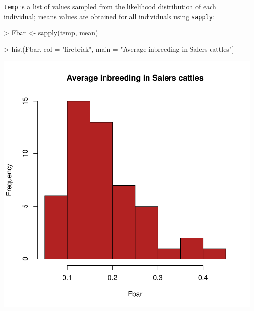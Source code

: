 \documentclass{article}
\begin{document}
\texttt{temp} is a list of values sampled from the likelihood distribution of each individual; means
values are obtained for all individuals using \texttt{sapply}:
\begin{Schunk}
\begin{Sinput}
> Fbar <- sapply(temp, mean)
\end{Sinput}
\end{Schunk}
\begin{Schunk}
\begin{Sinput}
> hist(Fbar, col = "firebrick", main = "Average inbreeding in Salers cattles")
\end{Sinput}
\end{Schunk}
\includegraphics{figs/base-063}
\end{document}
